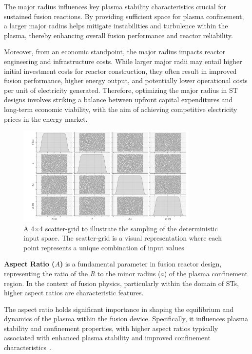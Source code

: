 \documentclass[journal]{IEEEtran}
\begin{document}
The major radius influences key plasma stability characteristics crucial for sustained fusion reactions. By providing sufficient space for plasma confinement, a larger major radius helps mitigate instabilities and turbulence within the plasma, thereby enhancing overall fusion performance and reactor reliability.

Moreover, from an economic standpoint, the major radius impacts reactor engineering and infrastructure costs. While larger major radii may entail higher initial investment costs for reactor construction, they often result in improved fusion performance, higher energy output, and potentially lower operational costs per unit of electricity generated. Therefore, optimizing the major radius in ST designs involves striking a balance between upfront capital expenditures and long-term economic viability, with the aim of achieving competitive electricity prices in the energy market.

\begin{figure}[t]
    \centering
    \includegraphics[width=0.8\textwidth]{figures/TE_results/4x4scatter_inputs_marchdata.png}
    \caption{\small A 4$\times$4 scatter-grid to illustrate the sampling of the deterministic input space. The scatter-grid is a visual representation where each point represents a unique combination of input values}\label{fig:scatter_sampling}
\end{figure}

\textbf{Aspect Ratio ($A$)} is a fundamental parameter in fusion reactor design, representing the ratio of the $R$ to the minor radius ($a$) of the plasma confinement region. In the context of fusion physics, particularly within the domain of STs, higher aspect ratios are characteristic features.

The aspect ratio holds significant importance in shaping the equilibrium and dynamics of the plasma within the fusion device. Specifically, it influences plasma stability and confinement properties, with higher aspect ratios typically associated with enhanced plasma stability and improved confinement characteristics~\cite{Costley2019}.
\end{document}
